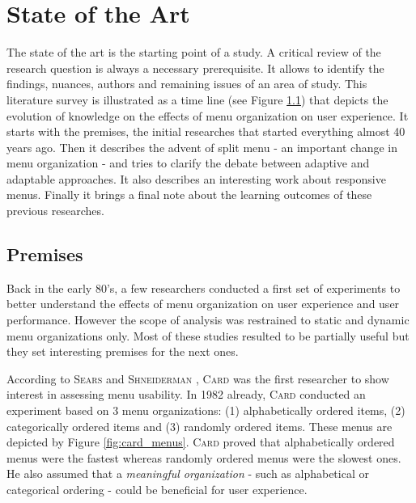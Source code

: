 \cleardoublepage
\chapter{State of the Art}

The state of the art is the starting point of a study. A critical 
review of the research question is always a necessary prerequisite. It allows 
to identify the findings, nuances, authors and remaining issues of an area of 
study. This literature survey is illustrated as a time line (see Figure 
\ref{fig:timeline}) that depicts the evolution of knowledge on the effects 
of menu organization on user experience. It starts with the premises, the 
initial researches that started everything almost 40 years ago. Then it 
describes the advent of split menu - an important change in menu organization - 
and tries to clarify the debate between adaptive and adaptable approaches. It 
also describes an interesting work about responsive menus. Finally it brings a 
final note about the learning outcomes of these previous researches.

\begin{figure}[ht!]
  
  \label{fig:timeline}
\end{figure}

\section{Premises}

Back in the early 80’s, a few researchers conducted a first set of experiments 
to better understand the effects of menu organization on user experience and 
user performance. However the scope of analysis was restrained to static and 
dynamic menu organizations only. Most of these studies resulted to be partially 
useful but they set interesting premises for the next ones.\newline
 
According to \textsc{Sears} and \textsc{Shneiderman} \cite{sears}, 
\textsc{Card} \cite{card} was the first 
researcher to show interest in assessing menu usability. In 1982 already, 
\textsc{Card} 
conducted an experiment based on 3 menu organizations: (1) alphabetically 
ordered items, (2) categorically ordered items and (3) randomly ordered items. 
These menus are depicted by Figure \ref{fig:card_menus}. \textsc{Card} proved 
that 
alphabetically ordered menus were the fastest whereas randomly ordered menus 
were the slowest ones. He also assumed that a \textit{meaningful organization} 
- such as 
alphabetical or categorical ordering - could be beneficial for user 
experience.\newline

